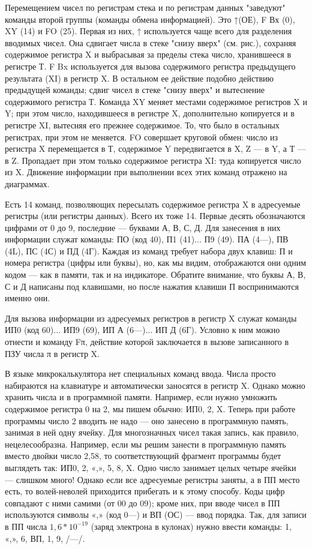 \documentclass[11pt,a4paper,oneside]{article}
\begin{document}
Перемещением чисел по регистрам стека и по регистрам данных "заведуют" команды второй группы (команды обмена информацией). Это ↑(ОЕ), F Вх (0), XY (14) и FO (25). Первая из них, ↑ используется чаще всего для разделения вводимых чисел. Она сдвигает числа в стеке "снизу вверх" (см. рис.), сохраняя содержимое регистра X и выбрасывая за пределы стека число, хранившееся в регистре Т. F Bx используется для вызова содержимого регистра предыдущего результата (XI) в регистр X. В остальном ее действие подобно действию предыдущей команды; сдвиг чисел в стеке "снизу вверх" и вытеснение содержимого регистра Т. Команда XY меняет местами содержимое регистров X и Y; при этом число, находившееся в регистре X, дополнительно копируется и в регистре XI, вытесняя его прежнее содержимое. То, что было в остальных регистрах, при этом не меняется. FO совершает круговой обмен: число из регистра X перемещается в Т, содержимое Y передвигается в X, Z — в Y, а Т — в Z. Пропадает при этом только содержимое регистра XI: туда копируется число из X. Движение информации при выполнении всех этих команд отражено на диаграммах.

Есть 14 команд, позволяющих пересылать содержимое регистра X в адресуемые регистры (или регистры данных). Всего их тоже 14. Первые десять обозначаются цифрами от 0 до 9, последние — буквами А, В, С, Д. Для занесения в них информации служат команды: ПО (код 40), П1 (41)... П9 (49). ПА (4—), ПВ (4L), ПС (4С) и ПД (4Г). Каждая из команд требует набора двух клавиш: П и номера регистра (цифры или буквы), но, как мы видим, отображаются они одним кодом — как в памяти, так и на индикаторе. Обратите внимание, что буквы А, В, С и Д написаны под клавишами, но после нажатия клавиши П воспринимаются именно они.

Для вызова информации из адресуемых регистров в регистр X служат команды ИП0 (код 60)... ИП9 (69), ИП А (6—)... ИП Д (6Г). Условно к ним можно отнести и команду Fπ, действие которой заключается в вызове записанного в ПЗУ числа π в регистр X.

В языке микрокалькулятора нет специальных команд ввода. Числа просто набираются на клавиатуре и автоматически заносятся в регистр X. Однако можно хранить числа и в программной памяти. Например, если нужно умножить содержимое регистра 0 на 2, мы пишем обычно: ИП0, 2, X. Теперь при работе программы число 2 вводить не надо — оно занесено в программную память, занимая в ней одну ячейку. Для многозначных чисел такая запись, как правило, нецелесообразна. Например, если мы решим занести в программную память вместо двойки число 2,58, то соответствующий фрагмент программы будет выглядеть так: ИП0, 2, «,», 5, 8, X. Одно число занимает целых четыре ячейки — слишком много! Однако если все адресуемые регистры заняты, а в ПП место есть, то волей-неволей приходится прибегать и к этому способу. Коды цифр совпадают с ними самими (от 00 до 09); кроме них, при вводе чисел в ПП используются символы «,» (код 0—) и ВП (ОС) — ввод порядка. Так, для записи в ПП числа $1,6*10^{-19}$ (заряд электрона в кулонах) нужно ввести команды: 1, «,», 6, ВП, 1, 9, /—/.
\end{document}
